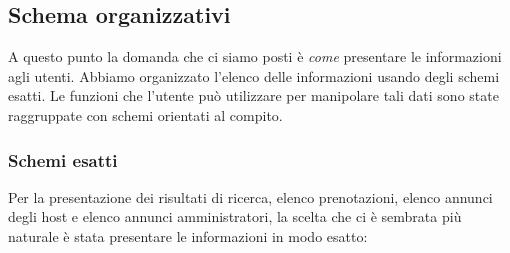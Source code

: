 \documentclass[1_relazione.tex]{subfiles}
\begin{document}
    \subsection{Schema organizzativi}
    A questo punto la domanda che ci siamo posti \`{e} \textit{come} presentare le informazioni agli utenti. Abbiamo organizzato l'elenco delle informazioni usando degli schemi esatti. Le funzioni che l'utente pu\`{o} utilizzare per manipolare tali dati sono state raggruppate con schemi orientati al compito.

    \subsubsection{Schemi esatti}
    Per la presentazione dei risultati di ricerca, elenco prenotazioni, elenco annunci degli host e elenco annunci amministratori, la scelta che ci \`{e} sembrata pi\`{u} naturale \`{e} stata presentare le informazioni in modo esatto:
\end{document}
